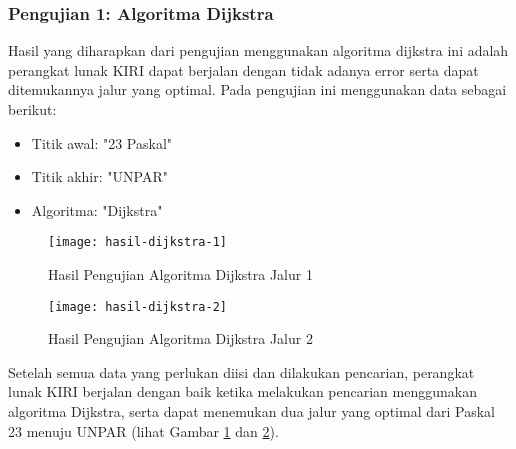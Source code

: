 \begin{comment}
\begin{table}[H]
\centering
\caption{Data Pengujian}
\label{tab:data}
{\large
\begin{tabular}{|l|l|}
\hline
\textbf{trackId}       & \textbf{trackName}             \\ \hline
ciroyomantapani & Ciroyom - Antapani \\ \hline
ciroyomciburial & Ciroyom - Ciburial \\ \hline
ciumbuleuitsthallbelok   & Ciumbuleuit - St. Hall (belok)     \\ \hline
ciumbuleuitsthalllurus        & Ciumbuleuit - St. Hall (lurus)             \\ \hline
dagocaringin        & Dago - Caringin             \\ \hline
\end{tabular}
}
\end{table}
\end{comment}

\subsubsection{Pengujian 1: Algoritma Dijkstra}
Hasil yang diharapkan dari pengujian menggunakan algoritma dijkstra ini adalah perangkat lunak KIRI dapat berjalan dengan tidak adanya error serta dapat ditemukannya jalur yang optimal. Pada pengujian ini menggunakan data sebagai berikut:
\begin{itemize}
    \item Titik awal: "23 Paskal"
    \item Titik akhir: "UNPAR"
    \item Algoritma: "Dijkstra"
\end{itemize}

\begin{figure}[H]
    \centering
    \texttt{[image: hasil-dijkstra-1]}
    \caption{Hasil Pengujian Algoritma Dijkstra Jalur 1}
    \label{fig:hasildijkstra-1}
\end{figure}

\begin{figure}[H]
    \centering
    \texttt{[image: hasil-dijkstra-2]}
    \caption{Hasil Pengujian Algoritma Dijkstra Jalur 2}
    \label{fig:hasildijkstra-2}
\end{figure}
\noindent
Setelah semua data yang perlukan diisi dan dilakukan pencarian, perangkat lunak KIRI berjalan dengan baik ketika melakukan pencarian menggunakan algoritma Dijkstra, serta dapat menemukan dua jalur yang optimal dari Paskal 23 menuju UNPAR (lihat Gambar \ref{fig:hasildijkstra-1} dan \ref{fig:hasildijkstra-2}).

